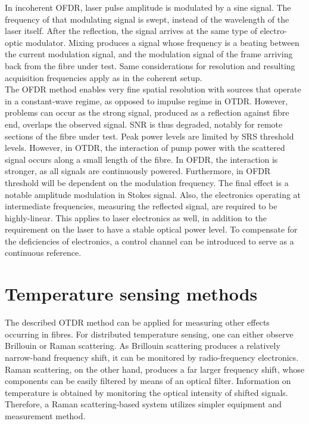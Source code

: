 \documentclass{standalone}
\begin{document}
In incoherent OFDR, laser pulse amplitude is modulated by a sine signal. The frequency of that modulating signal is swept, instead of the wavelength of the laser itself. After the reflection, the signal arrives at the same type of electro-optic modulator. Mixing produces a signal whose frequency is a beating between the current modulation signal, and the modulation signal of the frame arriving back from the fibre under test. Same considerations for resolution and resulting acquisition frequencies apply as in the coherent setup. \\

The OFDR method enables very fine spatial resolution with sources that operate in a constant-wave regime, as opposed to impulse regime in OTDR. However, problems can occur as the strong signal, produced as a reflection against fibre end, overlaps the observed signal. SNR is thus degraded, notably for remote sections of the fibre under test. Peak power levels are limited by SRS threshold levels. However, in OTDR, the interaction of pump power with the scattered signal occurs along a small length of the fibre. In OFDR, the interaction is stronger, as all signals are continuously powered. Furthermore, in OFDR threshold will be dependent on the modulation frequency. The final effect is a notable amplitude modulation in Stokes signal. Also, the electronics operating at intermediate frequencies, measuring the reflected signal, are required to be highly-linear. This applies to laser electronics as well, in addition to the requirement on the laser to have a stable optical power level. To compensate for the deficiencies of electronics, a control channel can be introduced to serve as a continuous reference.

\section{Temperature sensing methods}

The described OTDR method can be applied for measuring other effects occurring in fibres. For distributed temperature sensing, one can either observe Brillouin or Raman scattering. As Brillouin scattering produces a relatively narrow-band frequency shift, it can be monitored by radio-frequency electronics. Raman scattering, on the other hand, produces a far larger frequency shift, whose components can be easily filtered by means of an optical filter. Information on temperature is obtained by monitoring the optical intensity of shifted signals. Therefore, a Raman scattering-based system utilizes simpler equipment and measurement method. \\
\end{document}
